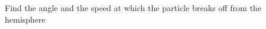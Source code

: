 \documentclass[main.tex]{subfiles}
\begin{document}
\begin{ex}{2.3}
Find the angle and the speed at which the particle breaks off from the hemisphere
\end{ex}

\begin{sol}
\end{sol}
\end{document}

